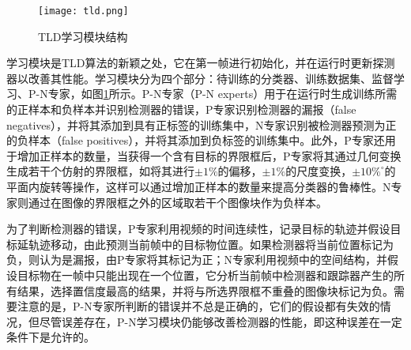 \begin{figure}[htb]
  \centering
  \texttt{[image: tld.png]}
  \caption{TLD学习模块结构}
  \label{fig:tldlearning}
\end{figure}

  学习模块是TLD算法的新颖之处，它在第一帧进行初始化，并在运行时更新探测器以改善其性能。学习模块分为四个部分：待训练的分类器、训练数据集、监督学习、P-N专家，如图\ref{fig:tldlearning}所示。P-N专家（P-N experts）用于在运行时生成训练所需的正样本和负样本并识别检测器的错误，P专家识别检测器的漏报（false negatives），并将其添加到具有正标签的训练集中，N专家识别被检测器预测为正的负样本（false positives），并将其添加到负标签的训练集中。此外，P专家还用于增加正样本的数量，当获得一个含有目标的界限框后，P专家将其通过几何变换生成若干个仿射的界限框，如将其进行$\pm 1\%$的偏移，$\pm 1\%$的尺度变换，$\pm 10\%^{\circ}$的平面内旋转等操作，这样可以通过增加正样本的数量来提高分类器的鲁棒性。N专家则通过在图像的界限框之外的区域取若干个图像块作为负样本。


  为了判断检测器的错误，P专家利用视频的时间连续性，记录目标的轨迹并假设目标延轨迹移动，由此预测当前帧中的目标物位置。如果检测器将当前位置标记为负，则认为是漏报，由P专家将其标记为正；N专家利用视频中的空间结构，并假设目标物在一帧中只能出现在一个位置，它分析当前帧中检测器和跟踪器产生的所有结果，选择置信度最高的结果，并将与所选界限框不重叠的图像块标记为负。需要注意的是，P-N专家所判断的错误并不总是正确的，它们的假设都有失效的情况，但尽管误差存在，P-N学习模块仍能够改善检测器的性能，即这种误差在一定条件下是允许的。
